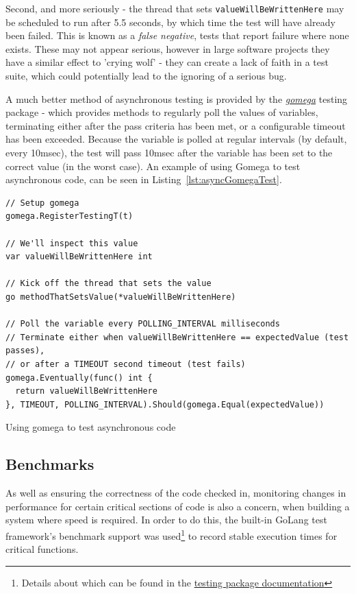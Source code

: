 Second, and more seriously - the thread that sets
\texttt{valueWillBeWrittenHere} may be scheduled to run after 5.5
seconds, by which time the test will have already been failed. This is known
as a \emph{\gls{false negative}}, tests that report failure where none exists.
These may not appear serious, however in large software projects they have a
similar effect to 'crying wolf' - they can create a lack of faith in a test
suite, which could potentially lead to the ignoring of a serious bug.

A much better method of asynchronous testing is provided by the
\href{https://github.com/onsi/gomega}{\emph{gomega}} testing package - which
provides methods to regularly poll the values of variables, terminating either
after the pass criteria has been met, or a configurable timeout has been
exceeded. Because the variable is polled at regular intervals (by default, every
10msec), the test will pass 10msec after the variable has been set to the
correct value (in the worst case). An example of using Gomega to test
asynchronous code, can be seen in Listing~\ref{lst:asyncGomegaTest}.

\begin{listing}[H]
  \centering
  \begin{verbatim}
// Setup gomega
gomega.RegisterTestingT(t)

// We'll inspect this value
var valueWillBeWrittenHere int

// Kick off the thread that sets the value
go methodThatSetsValue(*valueWillBeWrittenHere)

// Poll the variable every POLLING_INTERVAL milliseconds
// Terminate either when valueWillBeWrittenHere == expectedValue (test passes),
// or after a TIMEOUT second timeout (test fails)
gomega.Eventually(func() int {
  return valueWillBeWrittenHere
}, TIMEOUT, POLLING_INTERVAL).Should(gomega.Equal(expectedValue))
  \end{verbatim}
  \caption{Using gomega to test asynchronous code}
  \label{lst:asyncGomegaTest}
\end{listing}

\subsection{Benchmarks}
\label{sub:benchmarks}

As well as ensuring the correctness of the code checked in, monitoring changes
in performance for certain critical sections of code is also a concern, when
building a system where speed is required. In order to do this, the built-in
GoLang test framework's benchmark support was used\footnote{Details about which
can be found in the \href{https://golang.org/pkg/testing/}{testing package
documentation}} to record stable execution times for critical functions.

